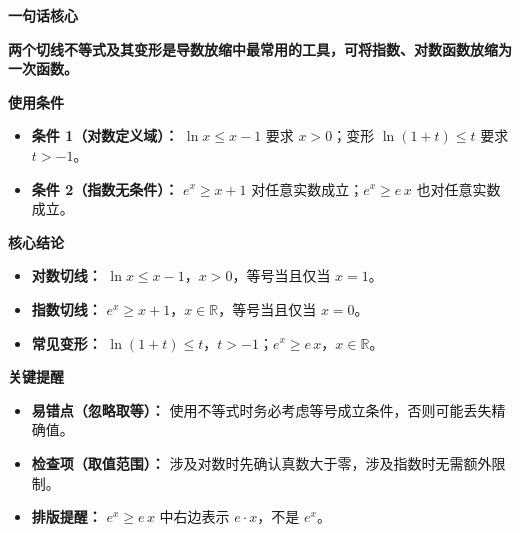 \begin{summarybox}
	\textbf{\textcolor{CSummary}{一句话核心}}

	\textbf{两个切线不等式及其变形是导数放缩中最常用的工具，可将指数、对数函数放缩为一次函数。}

	\medskip
	\textbf{\textcolor{CSummary}{使用条件}}
	\begin{itemize}[leftmargin=*, itemsep=0.5em, topsep=0.4em]
		\item \textbf{条件 1（对数定义域）：} $\ln x\le x-1$ 要求 $x>0$；变形 $\ln(1+t)\le t$ 要求 $t>-1$。
		\item \textbf{条件 2（指数无条件）：} $e^x\ge x+1$ 对任意实数成立；$e^x\ge e\,x$ 也对任意实数成立。
	\end{itemize}

	\medskip
	\textbf{\textcolor{CSummary}{核心结论}}
	\begin{itemize}[leftmargin=*, itemsep=0.5em, topsep=0.4em]
		\item \textbf{对数切线：} $\ln x\le x-1$，$x>0$，等号当且仅当 $x=1$。
		\item \textbf{指数切线：} $e^x\ge x+1$，$x\in\mathbb{R}$，等号当且仅当 $x=0$。
		\item \textbf{常见变形：} $\ln(1+t)\le t$，$t>-1$；$e^x\ge e\,x$，$x\in\mathbb{R}$。
	\end{itemize}

	\medskip
	\textbf{\textcolor{CSummary}{关键提醒}}
	\begin{itemize}[leftmargin=*, itemsep=0.5em, topsep=0.4em]
		\item \textbf{易错点（忽略取等）：} 使用不等式时务必考虑等号成立条件，否则可能丢失精确值。
		\item \textbf{检查项（取值范围）：} 涉及对数时先确认真数大于零，涉及指数时无需额外限制。
		\item \textbf{排版提醒：} $e^x\ge e\,x$ 中右边表示 $e\cdot x$，不是 $e^x$。
	\end{itemize}
\end{summarybox}